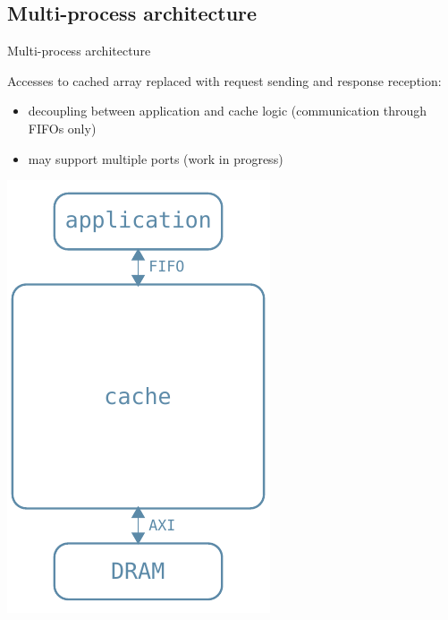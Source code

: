 \documentclass{beamer}
\begin{document}
\subsection{Multi-process architecture}
\begin{frame}{Multi-process architecture}
	\begin{minipage}{.7\textwidth}
		Accesses to cached array replaced with request sending
		and response reception:
		\begin{itemize}
			\item decoupling between application and cache logic
				(communication through FIFOs only)
			\item may support multiple ports (work in progress)
		\end{itemize}
	\end{minipage}
	\begin{minipage}{.29\textwidth}
		\begin{center}
			\includegraphics[width=.9\textwidth,height=.9\textheight,keepaspectratio]{complete_arch.pdf}
		\end{center}
	\end{minipage}
\end{frame}
\end{document}
